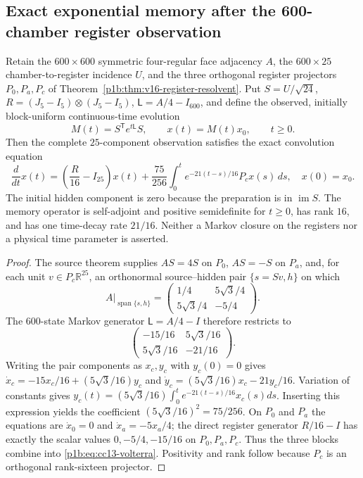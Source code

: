 \documentclass[11pt]{article}
\begin{document}
\subsection{Exact exponential memory after the 600-chamber register observation}
\label{p1b:sec:cc13-register-memory}

\begin{theorem}
\label{p1b:thm:cc13-register-memory}
Retain the $600\times600$ symmetric four-regular face adjacency $A$, the
$600\times25$ chamber-to-register incidence $U$, and the three orthogonal
register projectors $P_0,P_a,P_c$ of
Theorem~\ref{p1b:thm:v16-register-resolvent}.  Put
$S=U/\sqrt{24}$, $R=(J_5-I_5)\otimes(J_5-I_5)$,
$\mathsf L=A/4-I_{600}$, and define the observed, initially block-uniform
continuous-time evolution
\[
 M(t)=S^{\mathsf T}e^{t\mathsf L}S,\qquad x(t)=M(t)x_0,
 \qquad t\geq0.
\]
Then the complete $25$-component observation satisfies the exact
convolution equation
\begin{equation}\label{p1b:eq:cc13-volterra}
 \boxed{\frac{d}{dt}x(t)=\left(\frac R{16}-I_{25}\right)x(t)
 +\frac{75}{256}\int_0^t e^{-21(t-s)/16}P_cx(s)\,ds,\quad x(0)=x_0.}
\end{equation}
The initial hidden component is zero because the preparation is in
$\operatorname{im} S$.  The memory operator is self-adjoint and positive
semidefinite for $t\geq0$, has rank $16$, and has one time-decay rate
$21/16$.  Neither a Markov closure on the registers nor a physical time
parameter is asserted.
\end{theorem}
\begin{proof}
The source theorem supplies $AS=4S$ on $P_0$, $AS=-S$ on $P_a$, and,
for each unit $v\in P_c\mathbb R^{25}$, an orthonormal source--hidden pair
$\{s=Sv,h\}$ on which
\[
 A\big|_{\operatorname{span}\{s,h\}}=
 \begin{pmatrix}1/4&5\sqrt3/4\\5\sqrt3/4&-5/4\end{pmatrix}.
\]
The $600$-state Markov generator $\mathsf L=A/4-I$ therefore restricts to
\[
 \begin{pmatrix}-15/16&5\sqrt3/16\\5\sqrt3/16&-21/16\end{pmatrix}.
\]
Writing the pair components as $x_c,y_c$ with $y_c(0)=0$ gives
$\dot x_c=-15x_c/16+(5\sqrt3/16)y_c$ and
$\dot y_c=(5\sqrt3/16)x_c-21y_c/16$.  Variation of constants gives
$y_c(t)=(5\sqrt3/16)\int_0^t e^{-21(t-s)/16}x_c(s)ds$.
Inserting this expression yields the coefficient
$(5\sqrt3/16)^2=75/256$.  On $P_0$ and $P_a$ the equations are
$\dot x_0=0$ and $\dot x_a=-5x_a/4$; the direct register generator
$R/16-I$ has exactly the scalar values $0,-5/4,-15/16$ on
$P_0,P_a,P_c$.  Thus the three blocks combine into
\eqref{p1b:eq:cc13-volterra}.  Positivity and rank follow because
$P_c$ is an orthogonal rank-sixteen projector.
\end{proof}
\end{document}
